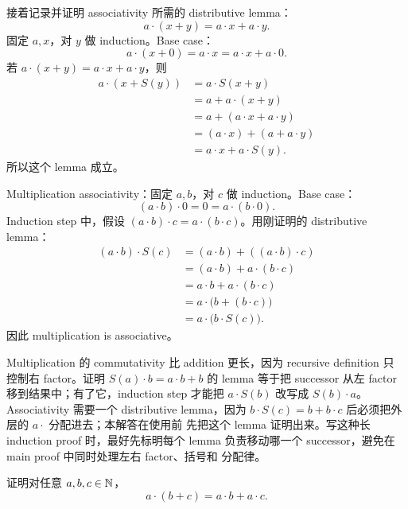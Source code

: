 \begin{solution}
接着记录并证明 associativity 所需的 distributive lemma：
\[
  a\cdot(x+y)=a\cdot x+a\cdot y.
\]
固定 \(a,x\)，对 \(y\) 做 induction。Base case：
\[
  a\cdot(x+0)=a\cdot x=a\cdot x+a\cdot0.
\]
若 \(a\cdot(x+y)=a\cdot x+a\cdot y\)，则
\[
\begin{aligned}
a\cdot(x+S(y))
  &=a\cdot S(x+y)\\
  &=a+a\cdot(x+y)\\
  &=a+(a\cdot x+a\cdot y)\\
  &=(a\cdot x)+(a+a\cdot y)\\
  &=a\cdot x+a\cdot S(y).
\end{aligned}
\]
所以这个 lemma 成立。

Multiplication associativity：固定 \(a,b\)，对 \(c\) 做 induction。Base case：
\[
  (a\cdot b)\cdot0=0=a\cdot(b\cdot0).
\]
Induction step 中，假设 \((a\cdot b)\cdot c=a\cdot(b\cdot c)\)。用刚证明的
distributive lemma：
\[
\begin{aligned}
(a\cdot b)\cdot S(c)
  &=(a\cdot b)+((a\cdot b)\cdot c)\\
  &=(a\cdot b)+a\cdot(b\cdot c)\\
  &=a\cdot b+a\cdot(b\cdot c)\\
  &=a\cdot\bigl(b+(b\cdot c)\bigr)\\
  &=a\cdot\bigl(b\cdot S(c)\bigr).
\end{aligned}
\]
因此 multiplication is associative。
\end{solution}

\begin{explanation}
Multiplication 的 commutativity 比 addition 更长，因为 recursive definition 只
控制右 factor。证明 \(S(a)\cdot b=a\cdot b+b\) 的 lemma 等于把 successor 从左
factor 移到结果中；有了它，induction step 才能把 \(a\cdot S(b)\) 改写成
\(S(b)\cdot a\)。Associativity 需要一个 distributive lemma，因为
\(b\cdot S(c)=b+b\cdot c\) 后必须把外层的 \(a\cdot\) 分配进去；本解答在使用前
先把这个 lemma 证明出来。写这种长 induction proof 时，最好先标明每个 lemma
负责移动哪一个 successor，避免在 main proof 中同时处理左右 factor、括号和
分配律。
\end{explanation}

\begin{exerciseblock}
证明对任意 \(a,b,c\in\mathbb{N}\)，
\[
  a\cdot(b+c)=a\cdot b+a\cdot c.
\]
\end{exerciseblock}


